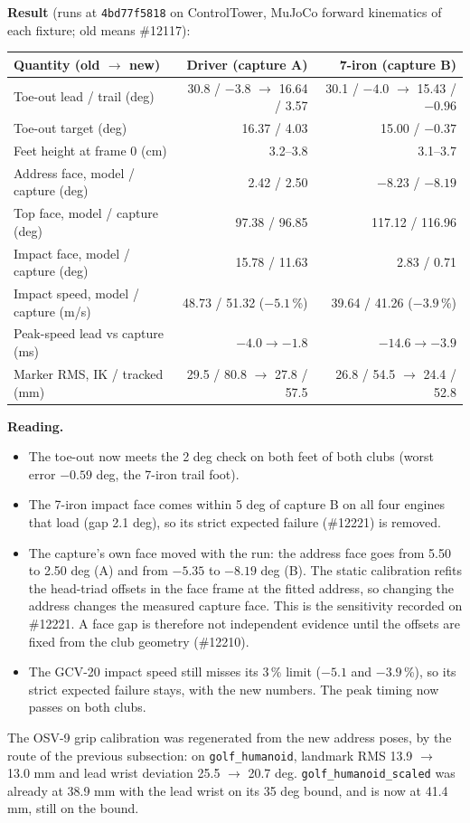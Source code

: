 \documentclass[11pt,a4paper]{article}
\begin{document}
\textbf{Result} (runs at \texttt{4bd77f5818} on ControlTower, MuJoCo forward
kinematics of each fixture; old means \#12117):
\begin{center}
\begin{tabular}{@{}lrr@{}}
\toprule
Quantity (old $\rightarrow$ new) & Driver (capture A) & 7-iron (capture B) \\
\midrule
Toe-out lead / trail (deg) & 30.8 / $-3.8$ $\rightarrow$ 16.64 / 3.57 & 30.1 / $-4.0$ $\rightarrow$ 15.43 / $-0.96$ \\
Toe-out target (deg) & 16.37 / 4.03 & 15.00 / $-0.37$ \\
Feet height at frame 0 (cm) & 3.2--3.8 & 3.1--3.7 \\
Address face, model / capture (deg) & 2.42 / 2.50 & $-8.23$ / $-8.19$ \\
Top face, model / capture (deg) & 97.38 / 96.85 & 117.12 / 116.96 \\
Impact face, model / capture (deg) & 15.78 / 11.63 & 2.83 / 0.71 \\
Impact speed, model / capture (m/s) & 48.73 / 51.32 ($-5.1$\,\%) & 39.64 / 41.26 ($-3.9$\,\%) \\
Peak-speed lead vs capture (ms) & $-4.0 \rightarrow -1.8$ & $-14.6 \rightarrow -3.9$ \\
Marker RMS, IK / tracked (mm) & 29.5 / 80.8 $\rightarrow$ 27.8 / 57.5 & 26.8 / 54.5 $\rightarrow$ 24.4 / 52.8 \\
\bottomrule
\end{tabular}
\end{center}
\textbf{Reading.}
\begin{itemize}
\item The toe-out now meets the 2 deg check on both feet of both clubs
  (worst error $-0.59$ deg, the 7-iron trail foot).
\item The 7-iron impact face comes within 5 deg of capture B on all four
  engines that load (gap 2.1 deg), so its strict expected failure (\#12221)
  is removed.
\item The capture's own face moved with the run: the address face goes from
  5.50 to 2.50 deg (A) and from $-5.35$ to $-8.19$ deg (B). The static
  calibration refits the head-triad offsets in the face frame at the fitted
  address, so changing the address changes the measured capture face. This
  is the sensitivity recorded on \#12221. A face gap is therefore not
  independent evidence until the offsets are fixed from the club geometry
  (\#12210).
\item The GCV-20 impact speed still misses its 3\,\% limit ($-5.1$ and
  $-3.9$\,\%), so its strict expected failure stays, with the new numbers.
  The peak timing now passes on both clubs.
\end{itemize}
The OSV-9 grip calibration was regenerated from the new address poses, by the
route of the previous subsection: on \texttt{golf\_humanoid}, landmark RMS
13.9 $\rightarrow$ 13.0 mm and lead wrist deviation 25.5 $\rightarrow$
20.7 deg. \texttt{golf\_humanoid\_scaled} was already at 38.9 mm with the
lead wrist on its 35 deg bound, and is now at 41.4 mm, still on the bound.
\end{document}
